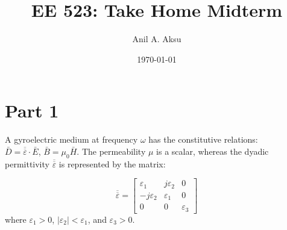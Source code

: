 \documentclass[11pt]{amsart}
\title{EE 523: Take Home Midterm}
\author{Anil A. Aksu}
\date{\today}
\begin{document}
\maketitle

\section*{Part 1 }
A gyroelectric medium at frequency $\omega$ has the constitutive relations:
\\
$\bar{D}=\overline{\overline{\varepsilon}}\cdot \bar{E}$, $\bar{B}=\mu_0 \bar{H}$. The permeability $\mu$ is a scalar, whereas the dyadic permittivity $\overline{\overline{\varepsilon}}$ is represented by the matrix: 


\begin{equation*}
\overline{\overline{\varepsilon}} =
\begin{bmatrix}
 \varepsilon_1 & j \varepsilon_2 & 0 \\ 
-j \varepsilon_2 &  \varepsilon_1 & 0 \\ 
0 & 0 & \varepsilon_3
\end{bmatrix}
\end{equation*}
where $\varepsilon_1 > 0$, $\left |  \varepsilon_2 \right | < \varepsilon_1$, and $\varepsilon_3>0$.
\end{document}
